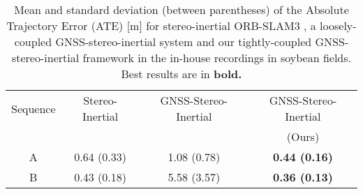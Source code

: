 \begin{table}[!tp]
    \centering
    \caption{Mean and standard deviation (between parentheses) of the Absolute Trajectory Error (ATE) [\si{\metre}] for stereo-inertial ORB-SLAM3 \cite{campos2021orbslam3}, a loosely-coupled GNSS-stereo-inertial system \cite{qin2019general} and our tightly-coupled GNSS-stereo-inertial framework in the in-house recordings in soybean fields. Best results are in \bf{bold}.}
    
    \resizebox{\linewidth}{!} {
        \begin{tabular}{cccc}
        \hline
                    Sequence & Stereo-Inertial & GNSS-Stereo-Inertial & GNSS-Stereo-Inertial \\
                    & \cite{campos2021orbslam3} & \cite{qin2019general} & (Ours) \\ \hline
        A &  0.64 (0.33) &  1.08 (0.78)                &  \bf{0.44 (0.16)} \\
        B & 0.43 (0.18)  &    5.58 (3.57)              & \bf{0.36 (0.13)} 
        \\
 \hline
        \end{tabular}
    }
    \label{tab:real_gps_results}
\end{table}